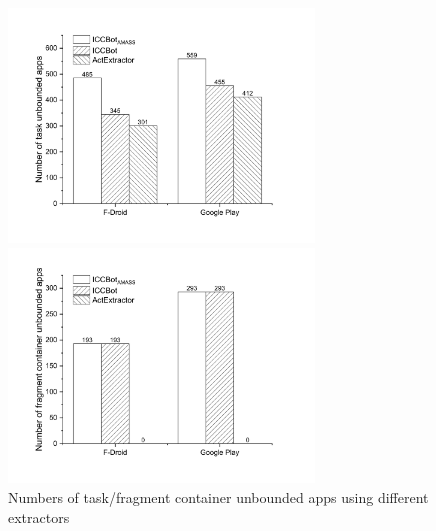 

\begin{figure}[htbp]
	\begin{minipage}[t]{0.49\linewidth}
		\centering
		\includegraphics[width=3.2in]{task_ubd.pdf}
	\end{minipage}
	\begin{minipage}[t]{0.49\linewidth}
		\centering
		\includegraphics[width=3.2in]{frag_ubd.pdf}
	\end{minipage}
	\caption{Numbers of task/fragment container unbounded apps using different extractors}
	\label{fig:cmp-extractor-ubd}
\end{figure}


